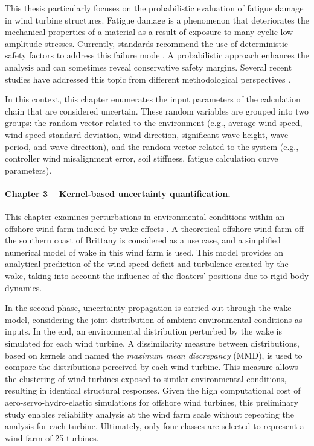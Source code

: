 This thesis particularly focuses on the probabilistic evaluation of fatigue damage in wind turbine structures. 
Fatigue damage is a phenomenon that deteriorates the mechanical properties of a material as a result of exposure to many cyclic low-amplitude stresses. 
Currently, standards recommend the use of deterministic safety factors to address this failure mode \citep{iec_2019,dnv_loads_2016}. 
A probabilistic approach enhances the analysis and can sometimes reveal conservative safety margins. 
Several recent studies have addressed this topic from different methodological perspectives \citep{huchet_2019,lataniotis_2019,cousin_2021,hirvoas_2021,petrovska_2022}.

In this context, this chapter enumerates the input parameters of the calculation chain that are considered uncertain. 
These random variables are grouped into two groups: the random vector related to the environment (e.g., average wind speed, wind speed standard deviation, wind direction, significant wave height, wave period, and wave direction), 
and the random vector related to the system (e.g., controller wind misalignment error, soil stiffness, fatigue calculation curve parameters).


\paragraph{Chapter 3 -- Kernel-based uncertainty quantification.} 
This chapter examines perturbations in environmental conditions within an offshore wind farm induced by wake effects \cite{larsen_2008_wake}. 
A theoretical offshore wind farm off the southern coast of Brittany is considered as a use case, and a simplified numerical model of wake in this wind farm is used. 
This model provides an analytical prediction of the wind speed deficit and turbulence created by the wake, taking into account the influence of the floaters' positions due to rigid body dynamics. 

In the second phase, uncertainty propagation is carried out through the wake model, considering the joint distribution of ambient environmental conditions as inputs. 
In the end, an environmental distribution perturbed by the wake is simulated for each wind turbine. 
A dissimilarity measure between distributions, based on kernels and named the \textit{maximum mean discrepancy} (MMD), is used to compare the distributions perceived by each wind turbine. 
This measure allows the clustering of wind turbines exposed to similar environmental conditions, resulting in identical structural responses. 
Given the high computational cost of aero-servo-hydro-elastic simulations for offshore wind turbines, this preliminary study enables reliability analysis at the wind farm scale without repeating the analysis for each turbine. 
Ultimately, only four classes are selected to represent a wind farm of 25 turbines.


